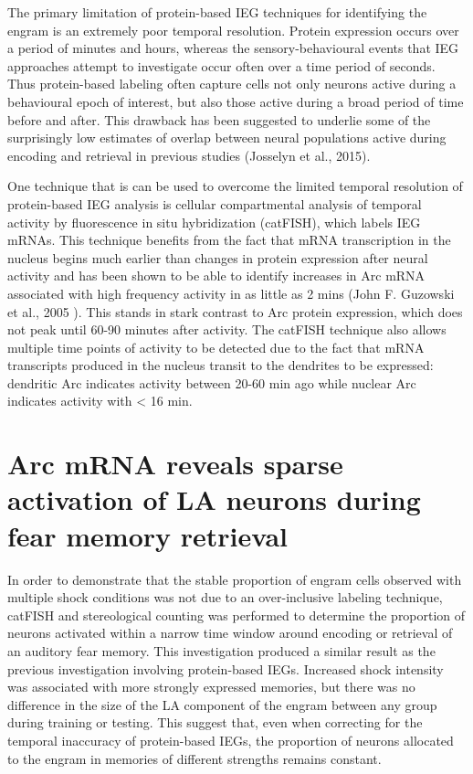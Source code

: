 \documentclass[12pt,a4paperpaper,]{report}
\begin{document}
The primary limitation of protein-based IEG techniques for identifying
the engram is an extremely poor temporal resolution. Protein expression
occurs over a period of minutes and hours, whereas the
sensory-behavioural events that IEG approaches attempt to investigate
occur often over a time period of seconds. Thus protein-based labeling
often capture cells not only neurons active during a behavioural epoch
of interest, but also those active during a broad period of time before
and after. This drawback has been suggested to underlie some of the
surprisingly low estimates of overlap between neural populations active
during encoding and retrieval in previous studies (Josselyn et al.,
2015).

One technique that is can be used to overcome the limited temporal
resolution of protein-based IEG analysis is cellular compartmental
analysis of temporal activity by fluorescence in situ hybridization
(catFISH), which labels IEG mRNAs. This technique benefits from the fact
that mRNA transcription in the nucleus begins much earlier than changes
in protein expression after neural activity and has been shown to be
able to identify increases in Arc mRNA associated with high frequency
activity in as little as 2 mins (John F. Guzowski et al., 2005 ). This
stands in stark contrast to Arc protein expression, which does not peak
until 60-90 minutes after activity. The catFISH technique also allows
multiple time points of activity to be detected due to the fact that
mRNA transcripts produced in the nucleus transit to the dendrites to be
expressed: dendritic Arc indicates activity between 20-60 min ago while
nuclear Arc indicates activity with \textless{} 16 min.

\section{Arc mRNA reveals sparse activation of LA neurons during fear
memory
retrieval}\label{arc-mrna-reveals-sparse-activation-of-la-neurons-during-fear-memory-retrieval}

In order to demonstrate that the stable proportion of engram cells
observed with multiple shock conditions was not due to an over-inclusive
labeling technique, catFISH and stereological counting was performed to
determine the proportion of neurons activated within a narrow time
window around encoding or retrieval of an auditory fear memory. This
investigation produced a similar result as the previous investigation
involving protein-based IEGs. Increased shock intensity was associated
with more strongly expressed memories, but there was no difference in
the size of the LA component of the engram between any group during
training or testing. This suggest that, even when correcting for the
temporal inaccuracy of protein-based IEGs, the proportion of neurons
allocated to the engram in memories of different strengths remains
constant.
\end{document}
